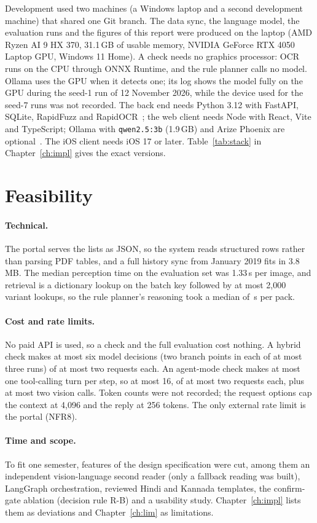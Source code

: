Development used two machines (a Windows laptop and a second development machine) that shared one
Git branch. The data sync, the language model, the evaluation runs and the figures of this report
were produced on the laptop (AMD Ryzen AI 9 HX 370, 31.1\,GB of usable memory, NVIDIA GeForce RTX
4050 Laptop GPU, Windows 11 Home). A check needs no graphics processor: OCR runs on the CPU through
ONNX Runtime, and the rule planner calls no model. Ollama uses the GPU when it detects one; its log
shows the model fully on the GPU during the seed-1 run of 12 November 2026, while the device used
for the seed-7 runs was not recorded. The back end needs Python 3.12 with FastAPI, SQLite,
RapidFuzz and RapidOCR~\cite{rapidai2021rapidocr,du2020ppocr}; the web client needs Node with React,
Vite and TypeScript; Ollama with \texttt{qwen2.5:3b} (1.9\,GB) and Arize Phoenix are
optional~\cite{arize2026openinference}. The iOS client needs iOS 17 or later. Table~\ref{tab:stack}
in Chapter~\ref{ch:impl} gives the exact versions.

\section{Feasibility}
\label{sec:req-feasibility}

\paragraph{Technical.} The portal serves the lists as JSON, so the system reads structured rows
rather than parsing PDF tables, and a full history sync from January 2019 fits in 3.8\,MB. The
median perception time on the evaluation set was 1.33\,s per image, and retrieval is a dictionary
lookup on the batch key followed by at most 2{,}000 variant lookups, so the rule planner's reasoning
took a median of \,s per pack.

\paragraph{Cost and rate limits.} No paid API is used, so a check and the full evaluation cost
nothing. A hybrid check makes at most six model decisions (two branch points in each of at most
three runs) of at most two requests each. An agent-mode check makes at most one tool-calling turn
per step, so at most 16, of at most two requests each, plus at most two vision calls. Token counts were not recorded; the request options cap
the context at 4{,}096 and the reply at 256 tokens. The only external rate limit is the portal (NFR8).

\paragraph{Time and scope.} To fit one semester, features of the design specification were cut,
among them an independent vision-language second reader (only a fallback reading was built), LangGraph orchestration, reviewed Hindi and Kannada
templates, the confirm-gate ablation (decision rule R-B) and a usability study. Chapter~\ref{ch:impl}
lists them as deviations and Chapter~\ref{ch:lim} as limitations.
